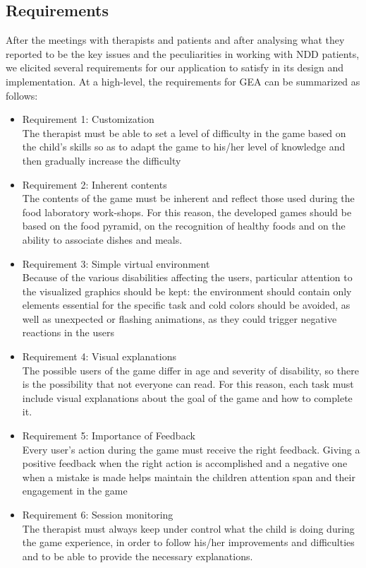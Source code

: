 \subsection{Requirements}
After the meetings with therapists and patients and after analysing what they reported to be the key issues and the peculiarities in working with NDD patients, we elicited several requirements for our application to satisfy in its design and implementation.
At a high-level, the requirements for GEA can be summarized as follows:
\begin{itemize}
\item Requirement 1: Customization\\
The therapist must be able to set a level of difficulty in the game based on the child's skills so as to  adapt the game to his/her level of knowledge and then gradually increase the difficulty
\item Requirement 2: Inherent contents\\
The contents of the game must be inherent and reflect those used during the food laboratory work-shops.  For this reason, the developed games should be based on the food pyramid, on the recognition of healthy foods and on the ability to associate dishes and meals.
\item Requirement 3: Simple virtual environment\\
Because of the various disabilities affecting the users, particular attention to the visualized graphics should be kept: the environment should contain only elements essential for the specific task and cold colors should be avoided, as well as unexpected or flashing animations, as they could trigger negative reactions in the users
\item Requirement 4: Visual explanations\\
The possible users of the game differ in age and severity of disability, so there is the possibility that not everyone can read. For this reason, each task must include visual explanations about the goal of the game and how to complete it.
\item Requirement 5: Importance of Feedback\\
Every user's action during the game must receive the right feedback. Giving a positive feedback when the right action is accomplished and a negative one when a mistake is made helps maintain the children attention span and their engagement in the game
\item Requirement 6: Session monitoring\\
The therapist must always keep under control what the child is doing during the game experience, in order to follow his/her improvements and difficulties and to be able to provide the necessary explanations.\\
\end{itemize}
